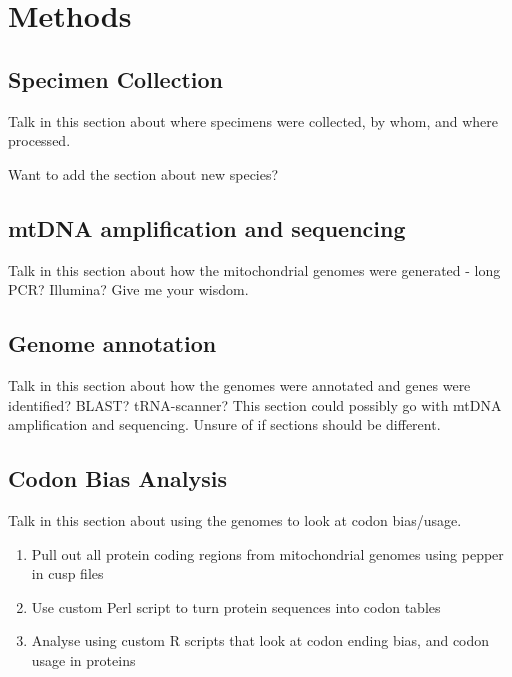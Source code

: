 \documentclass[../main.tex]{subfiles}
\begin{document}
\section{Methods}

\subsection{Specimen Collection}
Talk in this section about where specimens were collected, by whom, and where processed. 

Want to add the section about new species?

\subsection{mtDNA amplification and sequencing}
Talk in this section about how the mitochondrial genomes were generated - long PCR? Illumina? Give me your wisdom. 

\subsection{Genome annotation}
Talk in this section about how the genomes were annotated and genes were identified? BLAST? tRNA-scanner? This section could possibly go with mtDNA amplification and sequencing. Unsure of if sections should be different.

\subsection{Codon Bias Analysis}
Talk in this section about using the genomes to look at codon bias/usage.
\begin{enumerate}
    \item Pull out all protein coding regions from mitochondrial genomes using pepper in cusp files
    \item Use custom Perl script to turn protein sequences into codon tables
    \item Analyse using custom R scripts that look at codon ending bias, and codon usage in proteins
\end{enumerate}
\end{document}
